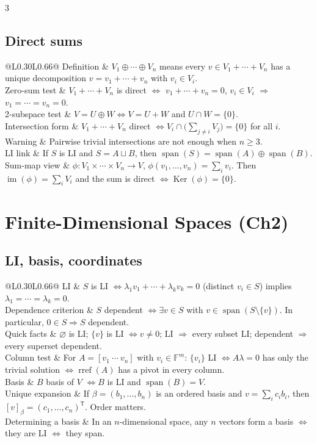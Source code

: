 \documentclass[10pt]{article}
\makeatletter
\newcommand{\F}{\mathbb{F}}
\newcommand{\Ker}{\operatorname{Ker}}
\newcommand{\im}{\operatorname{im}}
\newcommand{\spann}{\operatorname{span}}
\newcommand{\T}{^{\mathsf T}}
\newcommand{\cheattable}[1]{\begin{tabular}{@{}L{0.30\columnwidth}L{0.66\columnwidth}@{}}#1\end{tabular}}
\makeatother
\begin{document}
\begin{multicols}{3}
\subsection*{Direct sums}
\cheattable{
Definition & $V_1\oplus\cdots\oplus V_n$ means every $v\in V_1+\cdots+V_n$ has a unique decomposition $v=v_1+\cdots+v_n$ with $v_i\in V_i$.\\
Zero-sum test & $V_1+\cdots+V_n$ is direct $\iff$ $v_1+\cdots+v_n=0$, $v_i\in V_i$ $\Rightarrow$ $v_1=\cdots=v_n=0$.\\
2-subspace test & $V=U\oplus W \iff V=U+W$ and $U\cap W=\{0\}$.\\
Intersection form & $V_1+\cdots+V_n$ direct $\iff V_i\cap\bigl(\sum_{j\ne i}V_j\bigr)=\{0\}$ for all $i$.\\
Warning & Pairwise trivial intersections are not enough when $n\ge 3$.\\
LI link & If $S$ is LI and $S=A\sqcup B$, then $\spann(S)=\spann(A)\oplus\spann(B)$.\\
Sum-map view & $\phi:V_1\times\cdots\times V_n\to V$, $\phi(v_1,\dots,v_n)=\sum_i v_i$. Then $\im(\phi)=\sum_iV_i$ and the sum is direct $\iff \Ker(\phi)=\{0\}$.\\
}

\section*{Finite-Dimensional Spaces (Ch2)}

\subsection*{LI, basis, coordinates}
\cheattable{
LI & $S$ is LI $\iff \lambda_1v_1+\cdots+\lambda_kv_k=0$ (distinct $v_i\in S$) implies $\lambda_1=\cdots=\lambda_k=0$.\\
Dependence criterion & $S$ dependent $\iff \exists v\in S$ with $v\in\spann(S\setminus\{v\})$. In particular, $0\in S\Rightarrow S$ dependent.\\
Quick facts & $\varnothing$ is LI; $\{v\}$ is LI $\iff v\neq 0$; LI $\Rightarrow$ every subset LI; dependent $\Rightarrow$ every superset dependent.\\
Column test & For $A=[v_1\ \cdots\ v_n]$ with $v_i\in\F^m$: $\{v_i\}$ LI $\iff A\lambda=0$ has only the trivial solution $\iff \operatorname{rref}(A)$ has a pivot in every column.\\
Basis & $B$ basis of $V$ $\iff B$ is LI and $\spann(B)=V$.\\
Unique expansion & If $\beta=(b_1,\dots,b_n)$ is an ordered basis and $v=\sum_i c_i b_i$, then $[v]_\beta=(c_1,\dots,c_n)\T$. Order matters.\\
Determining a basis & In an $n$-dimensional space, any $n$ vectors form a basis $\iff$ they are LI $\iff$ they span.\\
}


\end{multicols}
\end{document}
